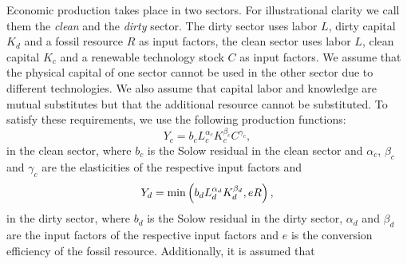 Economic production takes place in two sectors. For illustrational clarity we call them the \textit{clean} and the \textit{dirty} sector. The dirty sector uses labor $L$, dirty capital $K_d$ and a fossil resource $R$ as input factors, the clean sector uses labor $L$, clean capital $K_c$ and a renewable technology stock $C$ as input factors. We assume that the physical capital of one sector cannot be used in the other sector due to different technologies. We also assume that capital labor and knowledge are mutual substitutes but that the additional resource cannot be substituted. To satisfy these requirements, we use the following production functions:
\begin{equation}
	Y_c = b_c L_c^{\alpha_c}K_c^{\beta_c}C^{\gamma_c}, 
	\label{eq:clean_production}
\end{equation}
in the clean sector, where $b_c$ is the Solow residual in the clean sector and $\alpha_c$, $\beta_c$ and $\gamma_c$ are the elasticities of the respective input factors and
\begin{equation}
	Y_d = {\rm min}\left( b_d L_d^{\alpha_d}K_d^{\beta_d}, e R \right),
	\label{eq:dirty_production}
\end{equation}
in the dirty sector, where $b_d$ is the Solow residual in the dirty sector, $\alpha_d$ and $\beta_d$ are the input factors of the respective input factors and $e$ is the conversion efficiency of the fossil resource.
Additionally, it is assumed that
